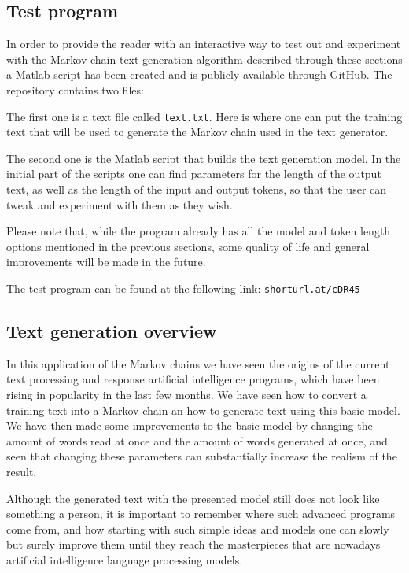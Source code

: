 \documentclass[12pt]{article}
\numberwithin{equation}{section}
\begin{document}
\subsection{Test program}

In order to provide the reader with an interactive way to test out and experiment with the Markov chain text generation algorithm described through these sections a Matlab script has been created and is publicly available through GitHub. The repository contains two files:

The first one is a text file called \texttt{text.txt}. Here is where one can put the training text that will be used to generate the Markov chain used in the text generator.

The second one is the Matlab script that builds the text generation model. In the initial part of the scripts one can find parameters for the length of the output text, as well as the length of the input and output tokens, so that the user can tweak and experiment with them as they wish.

Please note that, while the program already has all the model and token length options mentioned in the previous sections, some quality of life and general improvements will be made in the future.

The test program can be found at the following link: \texttt{shorturl.at/cDR45}


\subsection{Text generation overview}

In this application of the Markov chains we have seen the origins of the current text processing and response artificial intelligence programs, which have been rising in popularity in the last few months. We have seen how to convert a training text into a Markov chain an how to generate text using this basic model. We have then made some improvements to the basic model by changing the amount of words read at once and the amount of words generated at once, and seen that changing these parameters can substantially increase the realism of the result.

Although the generated text with the presented model still does not look like something a person, it is important to remember where such advanced programs come from, and how starting with such simple ideas and models one can slowly but surely improve them until they reach the masterpieces that are nowadays artificial intelligence language processing models.
\end{document}
